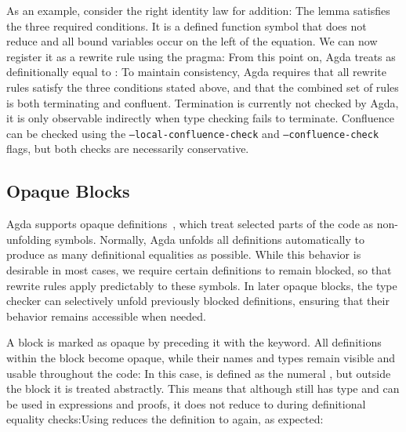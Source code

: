 \documentclass[screen,nonacm]{acmart}
\begin{document}
\noindent As an example, consider the right identity law for addition: \ERewrite{}The
lemma satisfies the three required conditions. It is a defined function symbol
that does not reduce and all bound variables occur on the left of the equation.
We can now register it as a rewrite rule using the
 pragma: \ERewriteIt{}From this point on, Agda treats
 \AgdaFunction{+}  as definitionally equal to
: \ERewriteEx{}To maintain consistency, Agda requires that all
rewrite rules satisfy the three conditions stated above, and that the combined
set of rules is both terminating and confluent. Termination is currently not
checked by Agda, it is only observable indirectly when type checking fails to
terminate. Confluence can be checked using the
\texttt{--local-confluence-check} and \texttt{--confluence-check} flags, but
both checks are necessarily conservative.

\subsection*{Opaque Blocks}
Agda supports opaque definitions~\cite{gratzer2022controlling}, which treat
selected parts of the code as non-unfolding symbols. Normally, Agda unfolds all
definitions automatically to produce as many definitional equalities as
possible. While this behavior is desirable in most cases, we require certain
definitions to remain blocked, so that rewrite rules apply predictably to these
symbols. In later opaque blocks, the type checker can selectively unfold
previously blocked definitions, ensuring that their behavior remains accessible
when needed.

A block is marked as opaque by preceding it with the 
keyword. All definitions within the block become opaque, while their names and
types remain visible and usable throughout the code: \EOpaque{}In this case,
 is defined as the numeral , but outside
the block it is treated abstractly. This means that although
 still has type  and can be used in
expressions and proofs, it does not reduce to  during
definitional equality checks:\EOpaqueExO{}Using  reduces
the definition to  again, as expected: \EOpaqueExT{}
\end{document}
